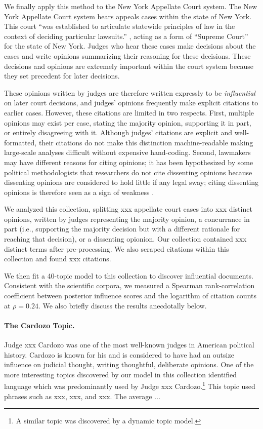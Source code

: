 We finally apply this method to the New York Appellate Court
system. The New York Appellate Court system hears appeals cases within
the state of New York.  This court ``was established to articulate
statewide principles of law in the context of deciding particular
lawsuits.'' \cite{foo}, acting as a form of ``Supreme Court'' for the
state of New York.  Judges who hear these cases make decisions about
the cases and write opinions summarizing their reasoning for these
decisions.  These decisions and opinions are extremely important
within the court system because they set precedent for later
decisions.

These opinions written by judges are therefore written expressly to be
\emph{influential} on later court decisions, and judges' opinions
frequently make explicit citations to earlier cases.  However, these
citations are limited in two respects.  First, multiple opinions may
exist per case, stating the majority opinion, supporting it in part,
or entirely disagreeing with it. Although judges' citations are
explicit and well-formatted, their citations do not make this
distinction machine-readable making large-scale analyses difficult
without expensive hand-coding. Second, lawmakers may have different
reasons for citing opinions; it has been hypothesized by some
political methodologists that researchers do not cite dissenting
opinions because dissenting opinions are considered to hold little if
any legal sway; citing dissenting opinions is therefore seen as a sign
of weakness \cite{beim:2011}.

We analyzed this collection, splitting xxx appellate court cases into
xxx distinct opinions, written by judges representing the majority
opinion, a concurrance in part (i.e., supporting the majority decision
but with a different rationale for reaching that decision), or a
dissenting opionion.  Our collection contained xxx distinct terms
after pre-processing. We also scraped citations within this collection
and found xxx citations.

We then fit a 40-topic model to this collection to discover
influential documents.  Consistent with the scientific corpora, we
measured a Spearman rank-correlation coefficient between posterior
influence scores and the logarithm of citation counts at $\rho=0.24$.
We also briefly discuss the results anecdotally below.

\paragraph{The Cardozo Topic.} Judge xxx Cardozo was one of the most
well-known judges in American political history.  Cardozo is known for
his and is considered to have had an outsize influence on judicial
thought, writing thoughtful, deliberate opinions.  One of the more
interesting topics discovered by our model in this collection
identified language which was predominantly used by Judge xxx
Cardozo.\footnote{A similar topic was discovered by a dynamic topic
  model.}  This topic used phrases such as xxx, xxx, and xxx. The
average ...
